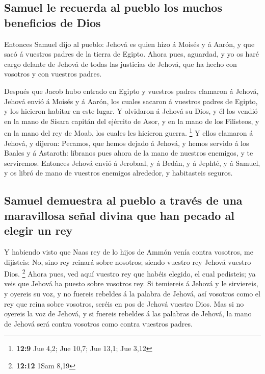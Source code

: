 \hypertarget{samuel-le-recuerda-al-pueblo-los-muchos-beneficios-de-dios}{%
\subsection{Samuel le recuerda al pueblo los muchos beneficios de
Dios}\label{samuel-le-recuerda-al-pueblo-los-muchos-beneficios-de-dios}}

 Entonces Samuel dijo al pueblo: Jehová es quien hizo á
Moisés y á Aarón, y que sacó á vuestros padres de la tierra de Egipto.
 Ahora pues, aguardad, y yo os haré cargo delante de Jehová
de todas las justicias de Jehová, que ha hecho con vosotros y con
vuestros padres.

 Después que Jacob hubo entrado en Egipto y vuestros padres
clamaron á Jehová, Jehová envió á Moisés y á Aarón, los cuales sacaron á
vuestros padres de Egipto, y los hicieron habitar en este lugar.
 Y olvidaron á Jehová su Dios, y él los vendió en la mano de
Sísara capitán del ejército de Asor, y en la mano de los Filisteos, y en
la mano del rey de Moab, los cuales les hicieron guerra. \footnote{\textbf{12:9}
  Jue 4,2; Jue 10,7; Jue 13,1; Jue 3,12}  Y ellos clamaron
á Jehová, y dijeron: Pecamos, que hemos dejado á Jehová, y hemos servido
á los Baales y á Astaroth: líbranos pues ahora de la mano de nuestros
enemigos, y te serviremos.  Entonces Jehová envió á
Jerobaal, y á Bedán, y á Jephté, y á Samuel, y os libró de mano de
vuestros enemigos alrededor, y habitasteis seguros.

\hypertarget{samuel-demuestra-al-pueblo-a-travuxe9s-de-una-maravillosa-seuxf1al-divina-que-han-pecado-al-elegir-un-rey}{%
\subsection{Samuel demuestra al pueblo a través de una maravillosa señal
divina que han pecado al elegir un
rey}\label{samuel-demuestra-al-pueblo-a-travuxe9s-de-una-maravillosa-seuxf1al-divina-que-han-pecado-al-elegir-un-rey}}

 Y habiendo visto que Naas rey de lo hijos de Ammón venía
contra vosotros, me dijisteis: No, sino rey reinará sobre nosotros;
siendo vuestro rey Jehová vuestro Dios. \footnote{\textbf{12:12} 1Sam
  8,19}  Ahora pues, ved aquí vuestro rey que habéis
elegido, el cual pedisteis; ya veis que Jehová ha puesto sobre vosotros
rey.  Si temiereis á Jehová y le sirviereis, y oyereis su
voz, y no fuereis rebeldes á la palabra de Jehová, así vosotros como el
rey que reina sobre vosotros, seréis en pos de Jehová vuestro Dios.
 Mas si no oyereis la voz de Jehová, y si fuereis rebeldes
á las palabras de Jehová, la mano de Jehová será contra vosotros como
contra vuestros padres.

